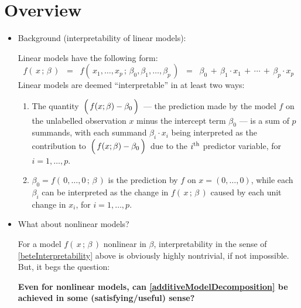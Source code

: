 

\section{Overview}
\setcounter{theorem}{0}
\setcounter{equation}{0}


\renewcommand{\theenumi}{\roman{enumi}}
\renewcommand{\labelenumi}{\textnormal{(\theenumi)}$\;\;$}


\begin{itemize}
\item
	Background (interpretability of linear models):
	
	Linear models have the following form:
	\begin{equation*}
	f(\,x\,;\,\beta\,)
	\;\; = \;\;
		f(\,x_{1},\ldots,x_{p}\,;\,\beta_{0},\beta_{1},\ldots,\beta_{p}\,)
	\;\; = \;\;
		\beta_{0} \,+\, \beta_{1}\cdot x_{1} \,+\, \cdots \,+\, \beta_{p}\cdot x_{p}
	\end{equation*}
	Linear models are deemed ``interpretable'' in at least two ways:
	\begin{enumerate}
	\item
		\label{additiveModelDecomposition}
		The quantity
		\,$\left(\,f(x;\beta) \overset{{\color{white}.}}{-} \beta_{0}\,\right)$\,
		--- the prediction made by the model $f$ on the unlabelled observation $x$
		minus the intercept term $\beta_{0}$ --- is a sum of $p$ summands,
		with each summand $\beta_{i}\cdot x_{i}$ being interpreted as the contribution to 
		\,$\left(\,f(x;\beta) \overset{{\color{white}.}}{-} \beta_{0}\,\right)$\,
		due to the $i^{\textnormal{th}}$ predictor variable, for $i = 1,\ldots,p$.
	\item
		\label{beteInterpretability}
		$\beta_{0} = f(\,0,\ldots,0\,;\,\beta\,)$ is the prediction by $f$ on $x = (0,\ldots,0)$,
		while each $\beta_{i}$ can be interpreted as the change in $f(\,x\,;\,\beta\,)$
		caused by each unit change in $x_{i}$, for $i = 1,\ldots,p$.
	\end{enumerate}
\item
	What about nonlinear models?
	
	For a model $f(\,x\,;\,\beta\,)$ nonlinear in $\beta$, interpretability in the sense of
	\eqref{beteInterpretability} above is obviously highly nontrivial, if not impossible.
	But, it begs the question:
	\begin{center}
	\vskip -0.2cm
	\textbf{\color{red}Even for nonlinear models, can \eqref{additiveModelDecomposition}
	be achieved in some (satisfying/useful) sense?}
	\end{center}


\end{itemize}
